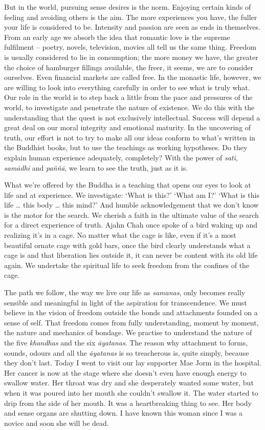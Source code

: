 But in the world, pursuing sense desires is the norm. Enjoying certain
kinds of feeling and avoiding others is the aim. The more experiences
you have, the fuller your life is considered to be. Intensity and
passion are seen as ends in themselves. From an early age we absorb the
idea that romantic love is the supreme fulfilment -- poetry, novels,
television, movies all tell us the same thing. Freedom is usually
considered to lie in consumption; the more money we have, the greater
the choice of hamburger fillings available, the freer, it seems, we are
to consider ourselves. Even financial markets are called free. In the
monastic life, however, we are willing to look into everything carefully
in order to see what is truly what. Our role in the world is to step
back a little from the pace and pressures of the world, to investigate
and penetrate the nature of existence. We do this with the understanding
that the quest is not exclusively intellectual. Success will depend a
great deal on our moral integrity and emotional maturity. In the
uncovering of truth, our effort is not to try to make all our ideas
conform to what's written in the Buddhist books, but to use the
teachings as working hypotheses. Do they explain human experience
adequately, completely? With the power of \emph{sati, samādhi} and
\emph{paññā}, we learn to see the truth, just as it is.

What we're offered by the Buddha is a teaching that opens our eyes to
look at life and at experience. We investigate: `What is this?' `What am
I?' `What is this life \ldots{} this body \ldots{} this mind?' And
humble acknowledgement that we don't know is the motor for the search.
We cherish a faith in the ultimate value of the search for a direct
experience of truth. Ajahn Chah once spoke of a bird waking up and
realizing it's in a cage. No matter what the cage is like, even if it's
a most beautiful ornate cage with gold bars, once the bird clearly
understands what a cage is and that liberation lies outside it, it can
never be content with its old life again. We undertake the spiritual
life to seek freedom from the confines of the cage.

The path we follow, the way we live our life as \emph{samanas}, only
becomes really sensible and meaningful in light of the aspiration for
transcendence. We must believe in the vision of freedom outside the
bonds and attachments founded on a sense of self. That freedom comes
from fully understanding, moment by moment, the nature and mechanics of
bondage. We practise to understand the nature of the five
\emph{khandhas} and the six \emph{āyatanas}. The reason why attachment
to forms, sounds, odours and all the \emph{āyatanas} is so treacherous
is, quite simply, because they don't last. Today I went to visit our lay
supporter Mae Jorm in the hospital. Her cancer is now at the stage where
she doesn't even have enough energy to swallow water. Her throat was dry
and she desperately wanted some water, but when it was poured into her
mouth she couldn't swallow it. The water started to drip from the side
of her mouth. It was a heartbreaking thing to see. Her body and sense
organs are shutting down. I have known this woman since I was a novice
and soon she will be dead.


